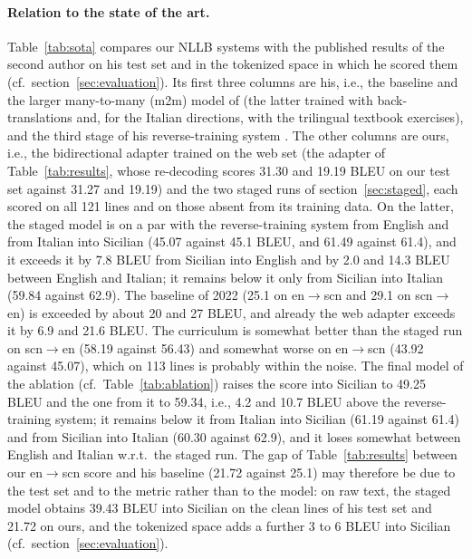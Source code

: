 \documentclass[11pt,a4paper]{article}
\begin{document}


\paragraph{Relation to the state of the art.}
\label{sec:sota}
Table~\ref{tab:sota} compares our NLLB systems with the published results of the second author
on his test set and in the tokenized space in which he scored them (cf.\
section~\ref{sec:evaluation}). Its first three columns are his, i.e., the baseline and the larger
many-to-many (m2m) model of \citet{wdowiak2022loresnmt} (the latter trained with back-translations
and, for the Italian directions, with the trilingual textbook exercises), and the third stage of
his reverse-training system \citep{wdowiakreverse}. The other columns are ours, i.e., the
bidirectional adapter trained on the web set (the adapter of Table~\ref{tab:results}, whose re-decoding scores 31.30 and 19.19 BLEU on our test set against 31.27 and 19.19) and the two staged runs of
section~\ref{sec:staged}, each scored on all 121 lines and on those absent from its training
data. On the latter, the staged model is on a par with the reverse-training system from English
and from Italian into Sicilian (45.07 against 45.1 BLEU, and 61.49 against 61.4), and it exceeds
it by 7.8 BLEU from Sicilian into English and by 2.0 and 14.3 BLEU between English and Italian;
it remains below it only from Sicilian into Italian (59.84 against 62.9). The baseline of 2022 (25.1
on en$\rightarrow$scn and 29.1 on scn$\rightarrow$en) is exceeded by about 20 and 27 BLEU, and
already the web adapter exceeds it by 6.9 and 21.6 BLEU. The curriculum is somewhat better than the
staged run on scn$\rightarrow$en (58.19 against 56.43) and somewhat worse on
en$\rightarrow$scn (43.92 against 45.07), which on 113 lines is probably within the noise. The
final model of the ablation (cf.\ Table~\ref{tab:ablation}) raises the score into Sicilian
to 49.25 BLEU and the one from it to 59.34, i.e., 4.2 and 10.7 BLEU above the reverse-training
system; it remains below it from Italian into Sicilian (61.19 against 61.4) and from Sicilian into
Italian (60.30 against 62.9), and it loses somewhat between English and Italian w.r.t.\ the staged run. The
gap of Table~\ref{tab:results} between our en$\rightarrow$scn score and his baseline (21.72
against 25.1) may therefore be due to the test set and to the metric rather than to the model: on
raw text, the staged model obtains 39.43 BLEU into Sicilian on the clean lines of his test set
and 21.72 on ours, and the tokenized space adds a further 3 to 6 BLEU into Sicilian (cf.\
section~\ref{sec:evaluation}).
\end{document}
